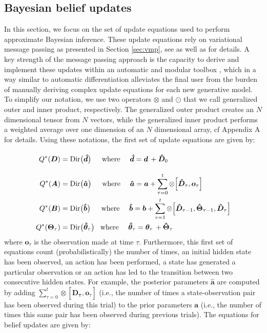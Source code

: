 \documentclass[twoside,11pt]{article}
\begin{document}
\subsection{Bayesian belief updates} \label{sec:updates}

In this section, we focus on the set of update equations used to perform approximate Bayesian inference. These update equations rely on variational message passing as presented in Section \ref{sec:vmp}, see \citet{AI_VMP} as well as \citet{VMP_TUTO} for details. A key strength of the message passing approach is the capacity to derive and implement these updates within an automatic and modular toolbox \citep{Simul_AI,DBLP:journals/ijar/CoxLV19}, which in a way similar to automatic differentiation alleviates the final user from the burden of manually deriving complex update equations for each new generative model. To simplify our notation, we use two operators $\otimes$ and $\odot$ that we call generalized outer and inner product, respectively. The generalized outer product creates an $N$ dimensional tensor from $N$ vectors, while the generalized inner product performs a weighted average over one dimension of an $N$ dimensional array, cf Appendix A for details. Using these notations, the first set of update equations are given by:
\begin{align}
Q^*(\bm{D}) &= \text{Dir}\big(\bm{\hat{d}}\big) \,\quad \text{ where } \quad \bm{\hat{d}} = \bm{d} \,+ \bm{\hat{D}}_0 {\color{white}\sum_{\tau}^{t}}\\
Q^*(\bm{A}) &= \text{Dir}\big(\bm{\hat{a}}\big) \,\quad \text{ where }\quad \bm{\hat{a}} = \bm{a} + \sum_{\tau = 0}^t \otimes \Big[ \bm{\hat{D}}_\tau, \bm{o}_\tau\Big]\\
Q^*(\bm{B}) &= \text{Dir}\big(\bm{\hat{b}}\big) \,\quad \text{ where } \quad \bm{\hat{b}} = \bm{b} + \sum_{\tau = 1}^t \otimes \Big[ \bm{\hat{D}}_{\tau - 1}, \bm{\hat{\Theta}}_{\tau - 1}, \bm{\hat{D}}_{\tau}\Big]\\
Q^*(\bm{\Theta}_\tau) &= \text{Dir}\big(\bm{\hat{\theta}}_\tau\big) \,\,\, \text{ where } \quad \bm{\hat{\theta}}_\tau = \bm{\theta}_\tau \, + \bm{\hat{\Theta}}_\tau
\end{align}
where $\bm{o}_\tau$ is the observation made at time $\tau$. Furthermore, this first set of equations count (probabilistically) the number of times, an initial hidden state has been observed, an action has been performed, a state has generated a particular observation or an action has led to the transition between two consecutive hidden states. For example, the posterior parameters $\bm{\hat{a}}$ are computed by adding $\sum_{\tau = 0}^t \otimes [ \bm{\hat{D}_\tau}, \bm{o}_\tau]$ (i.e., the number of times a state-observation pair has been observed during this trial) to the prior parameters $\bm{a}$ (i.e., the number of times this same pair has been observed during previous trials). The equations for belief updates are given by:
\end{document}
